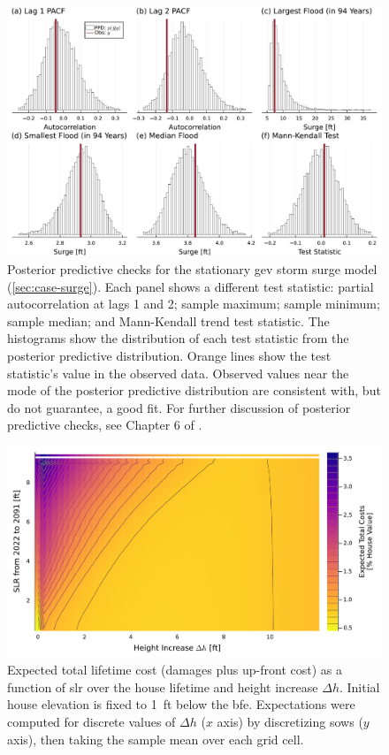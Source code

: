 \documentclass[ef,draft]{agutexSI2019}
\begin{document}
\begin{figure}
    \centering
    \includegraphics[width=\textwidth]{surge-test-statistics}
    \caption{
        Posterior predictive checks for the stationary \gls{gev} storm surge model (\cref{sec:case-surge}).
        Each panel shows a different test statistic: partial autocorrelation at lags 1 and 2; sample maximum; sample minimum; sample median; and Mann-Kendall trend test statistic.
        The histograms show the distribution of each test statistic from the posterior predictive distribution.
        Orange lines show the test statistic's value in the observed data.
        Observed values near the mode of the posterior predictive distribution are consistent with, but do not guarantee, a good fit.
        For further discussion of posterior predictive checks, see Chapter 6 of .
    }\label{fig:surge-test-statistics}
\end{figure}

\begin{figure}
    \includegraphics[width=\textwidth]{scenario-map-height-slr}
    \caption{
        Expected total lifetime cost (damages plus up-front cost) as a function of \gls{slr} over the house lifetime and height increase $\Delta h$.
        Initial house elevation is fixed to \SI{1}{ft} below the \gls{bfe}.
        Expectations were computed for discrete values of $\Delta h$ ($x$ axis) by discretizing \glspl{sow} ($y$ axis), then taking the sample mean over each grid cell.
    }\label{fig:scenario-map-height-slr}
\end{figure}
\end{document}
